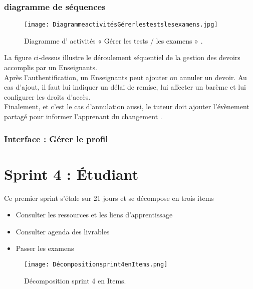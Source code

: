 \subsubsection{diagramme de séquences }
\begin{figure}[ht]
	\centering
	\texttt{[image: DiagrammeactivitésGérerlestestslesexamens.jpg]}
	\caption{Diagramme d' activités « Gérer les tests / les examens » .}
	\label{fig:Diagramme d' activités  Gérer les tests / les examens }
\end{figure}
\FloatBarrier
{}

La figure ci-dessus illustre le déroulement séquentiel de la gestion des devoirs accomplis par un
Enseignants.\\
Après l’authentification, un Enseignants peut ajouter ou annuler un devoir. Au cas d’ajout, il faut lui
indiquer un délai de remise, lui affecter un barème et lui configurer les droits d’accès.\\
Finalement, et c’est le cas d’annulation aussi, le tuteur doit ajouter l’évènement partagé pour informer l’apprenant du changement .
\clearpage
\subsubsection{ Interface : Gérer le profil  }


\clearpage
\section{Sprint 4 : Étudiant}
\label{sec:conception}

\begin{fquote}
	Ce premier sprint s’étale sur 21 jours et se décompose en trois items
\end{fquote}
\smallskip
\begin{itemize}[label=$\diamond$]
	\item Consulter les ressources et les liens d'apprentissage
	
	\item Consulter agenda des livrables
	
	\item Passer les examens
	
\end{itemize}
\medskip
\medskip
\medskip
\medskip
\medskip
\medskip
\medskip
\medskip
\medskip
\medskip
\begin{figure}[ht]
	\centering
	\texttt{[image: Décompositionsprint4enItems.png]}
	\caption{Décomposition sprint 4 en Items.}
	\label{fig:Démposition sprint 4 en Items}
\end{figure}
\FloatBarrier
\clearpage



